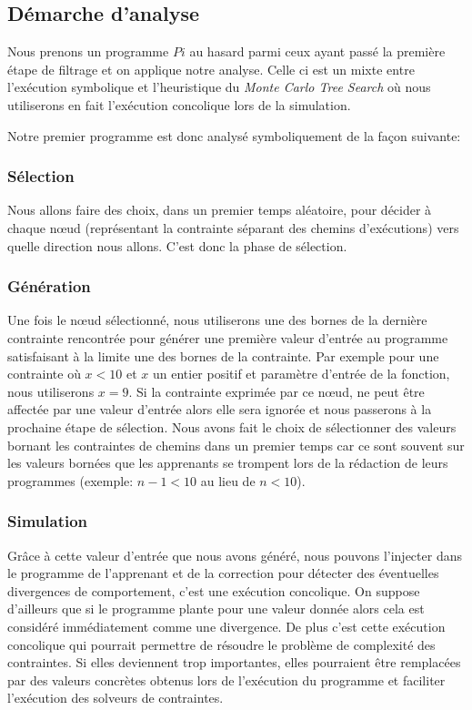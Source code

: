 \subsection*{Démarche d'analyse}
Nous prenons un programme $Pi$ au hasard parmi ceux ayant passé la première étape de filtrage et on applique notre analyse. Celle ci est un mixte entre l'exécution symbolique et l'heuristique du \textit{Monte Carlo Tree Search} où nous utiliserons en fait l'exécution concolique lors de la simulation.

Notre premier programme est donc analysé symboliquement de la façon suivante:

\subsubsection*{Sélection}
Nous allons faire des choix, dans un premier temps aléatoire, pour décider à chaque nœud (représentant la contrainte séparant des chemins d'exécutions) vers quelle direction nous allons. C'est donc la phase de sélection.

\subsubsection*{Génération}
Une fois le nœud sélectionné, nous utiliserons une des bornes de la dernière contrainte rencontrée pour générer une première valeur d'entrée au programme satisfaisant à la limite une des bornes de la contrainte. 
Par exemple pour une contrainte où $x < 10$ et $x$ un entier positif et paramètre d'entrée de la fonction, nous utiliserons $x = 9$. Si la contrainte exprimée par ce nœud, ne peut être affectée par une valeur d'entrée alors elle sera ignorée et nous passerons à la prochaine étape de sélection.
Nous avons fait le choix de sélectionner des valeurs bornant les contraintes de chemins dans un premier temps car ce sont souvent sur les valeurs bornées que les apprenants se trompent lors de la rédaction de leurs programmes (exemple: $n-1 < 10$ au lieu de $n < 10$).

\subsubsection*{Simulation}
Grâce à cette valeur d'entrée que nous avons généré, nous pouvons l'injecter dans le programme de l'apprenant et de la correction pour détecter des éventuelles divergences de comportement, c'est une exécution concolique. On suppose d'ailleurs que si le programme plante pour une valeur donnée alors cela est considéré immédiatement comme une divergence.
De plus c'est cette exécution concolique qui pourrait permettre de résoudre le problème de complexité des contraintes. Si elles deviennent trop importantes, elles pourraient être remplacées par des valeurs concrètes obtenus lors de l'exécution du programme et faciliter l'exécution des solveurs de contraintes.

